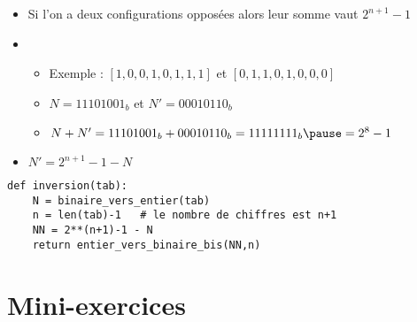 \begin{frame}[fragile]

\begin{itemize}
  \item Si l'on a deux configurations opposées alors leur somme vaut $2^{n+1}-1$

\pause

  \item 
  \begin{itemize}
    \item Exemple : $[1,0,0,1,0,1,1,1]$ et $[0,1,1,0,1,0,0,0]$
\pause    
    \item $N = 11101001_b$ et $N' = 00010110_b$
\pause    
    \item $N + N' = 11101001_b + 00010110_b = 11111111_b \pause = 2^{8}-1$
  \end{itemize}

\pause
  \item $N' = 2^{n+1}-1 - N$
\end{itemize}
\pause 
\begin{algo}[binaire.py (5)]
\begin{lstlisting}
def inversion(tab):
    N = binaire_vers_entier(tab)
    n = len(tab)-1   # le nombre de chiffres est n+1
    NN = 2**(n+1)-1 - N
    return entier_vers_binaire_bis(NN,n)
\end{lstlisting}  
\end{algo}

\end{frame}

  

\section{Mini-exercices}

